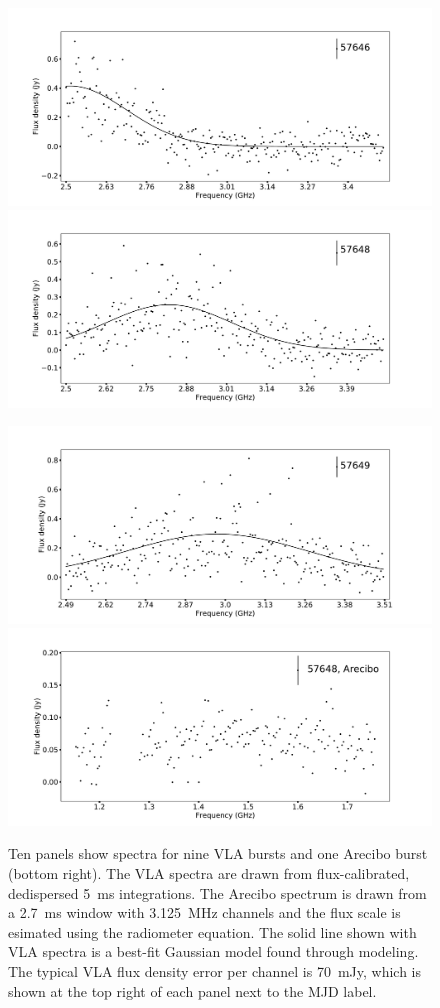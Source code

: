 \documentclass[twocolumn]{aastex61}
\begin{document}
\begin{figure}[ht]
\begin{center}
 \begin{minipage}{2\columnwidth}
  \includegraphics[width=0.5\columnwidth]{spec_57646.pdf}
  \includegraphics[width=0.5\columnwidth]{spec_57648.pdf}
 \end{minipage}

 \begin{minipage}{2\columnwidth}
  \includegraphics[width=0.5\columnwidth]{spec_57649.pdf}
  \includegraphics[width=0.5\columnwidth]{specAO_57648.pdf}
 \end{minipage}
\caption{Ten panels show spectra for nine VLA bursts and one Arecibo burst (bottom right). The VLA spectra are drawn from flux-calibrated, dedispersed 5~ms integrations. The Arecibo spectrum is drawn from a 2.7~ms window with 3.125~MHz channels and the flux scale is esimated using the radiometer equation. The solid line shown with VLA spectra is a best-fit Gaussian model found through modeling. The typical VLA flux density error per channel is 70~mJy, which is shown at the top right of each panel next to the MJD label.
\label{fig:spec}}
\end{center}
\end{figure}
\end{document}
